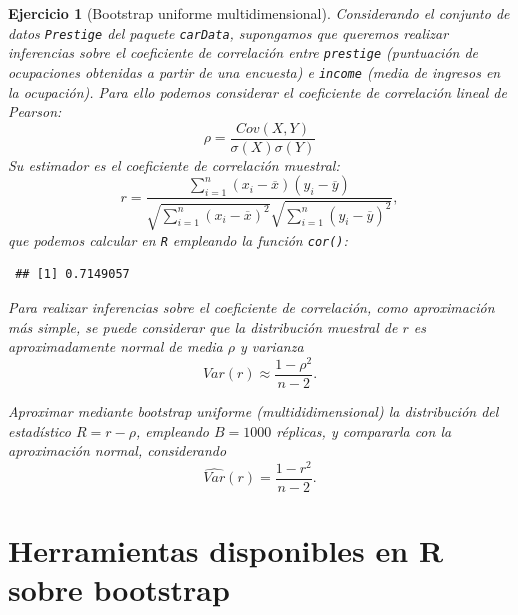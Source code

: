\documentclass[
]{book}
\newenvironment{Shaded}{\begin{snugshade}}{\end{snugshade}}
\newcommand{\AttributeTok}[1]{\textcolor[rgb]{0.77,0.63,0.00}{#1}}
\newcommand{\CommentTok}[1]{\textcolor[rgb]{0.56,0.35,0.01}{\textit{#1}}}
\newcommand{\FunctionTok}[1]{\textcolor[rgb]{0.00,0.00,0.00}{#1}}
\newcommand{\NormalTok}[1]{#1}
\newcommand{\SpecialCharTok}[1]{\textcolor[rgb]{0.00,0.00,0.00}{#1}}
\newcommand{\StringTok}[1]{\textcolor[rgb]{0.31,0.60,0.02}{#1}}
\theoremstyle{break}
\newtheorem{exercise}{Ejercicio}[chapter]
\theoremstyle{nonumberplain}
\renewcommand{\CommentTok}[1]{\textcolor[rgb]{0.41,0.41,0.41}{\texttt{#1}}}
\begin{document}
\begin{exercise}[Bootstrap uniforme multidimensional]
\protect\hypertarget{exr:unif-multi}{}\label{exr:unif-multi}
Considerando el conjunto de datos \texttt{Prestige} del paquete \texttt{carData}, supongamos que queremos realizar inferencias sobre el coeficiente de correlación entre \texttt{prestige} (puntuación de ocupaciones obtenidas a partir de una encuesta) e \texttt{income} (media de ingresos en la ocupación).
Para ello podemos considerar el coeficiente de correlación lineal de Pearson:
\[\rho =\frac{ Cov \left( X, Y \right) }
{ \sigma \left( X \right) \sigma \left( Y \right) }\]
Su estimador es el coeficiente de correlación muestral:
\[r=\frac{\sum_{i=1}^{n}(x_i-\overline{x})(y_i-\overline{y})}
{\sqrt{ \sum_{i=1}^{n}(x_i-\overline{x})^{2}} 
\sqrt{\sum_{i=1}^{n}(y_i-\overline{y})^{2}}},\]
que podemos calcular en \texttt{R} empleando la función \texttt{cor()}:

\begin{Shaded}
\end{Shaded}

\begin{verbatim}
 ## [1] 0.7149057
\end{verbatim}

Para realizar inferencias sobre el coeficiente de correlación, como aproximación más simple, se puede considerar que la distribución muestral de \(r\) es aproximadamente normal de media \(\rho\) y varianza
\[Var(r) \approx \frac{1 - \rho^2}{n - 2}.\]

Aproximar mediante bootstrap uniforme (multididimensional) la distribución del estadístico \(R = r -\rho\), empleando \(B=1000\) réplicas, y compararla con la aproximación normal, considerando
\[\widehat{Var}(r) = \frac{1 - r^2}{n - 2}.\]
\end{exercise}

\hypertarget{intro-paquetes}{%
\section{Herramientas disponibles en R sobre bootstrap}\label{intro-paquetes}}
\end{document}
